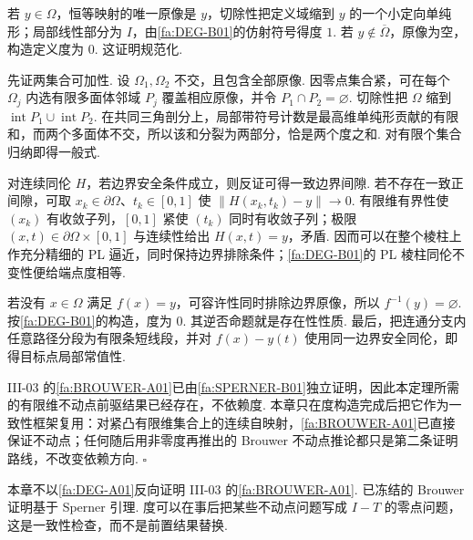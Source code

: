 \begin{FAProof}
若 \(\displaystyle y\in\Omega\)，恒等映射的唯一原像是 \(\displaystyle y\)，切除性把定义域缩到 \(\displaystyle y\) 的一个小定向单纯形；局部线性部分为 \(\displaystyle I\)，由\autoref{fa:DEG-B01}的仿射符号得度 \(\displaystyle1\). 若 \(\displaystyle y\notin\overline\Omega\)，原像为空，构造定义度为 \(\displaystyle0\). 这证明规范化.

先证两集合可加性. 设 \(\displaystyle\Omega_1,\Omega_2\) 不交，且包含全部原像. 因零点集合紧，可在每个 \(\displaystyle\Omega_j\) 内选有限多面体邻域 \(\displaystyle P_j\) 覆盖相应原像，并令 \(\displaystyle P_1\cap P_2=\varnothing\). 切除性把 \(\displaystyle\Omega\) 缩到 \(\displaystyle\operatorname{int}P_1\cup\operatorname{int}P_2\). 在共同三角剖分上，局部带符号计数是最高维单纯形贡献的有限和，而两个多面体不交，所以该和分裂为两部分，恰是两个度之和. 对有限个集合归纳即得一般式.

对连续同伦 \(\displaystyle H\)，若边界安全条件成立，则反证可得一致边界间隙. 若不存在一致正间隙，可取 \(\displaystyle x_k\in\partial\Omega\)、\(\displaystyle t_k\in[0,1]\) 使 \(\displaystyle\|H(x_k,t_k)-y\|\to0\). 有限维有界性使 \(\displaystyle(x_k)\) 有收敛子列，\(\displaystyle[0,1]\) 紧使 \(\displaystyle(t_k)\) 同时有收敛子列；极限 \(\displaystyle(x,t)\in\partial\Omega\times[0,1]\) 与连续性给出 \(\displaystyle H(x,t)=y\)，矛盾. 因而可以在整个棱柱上作充分精细的 PL 逼近，同时保持边界排除条件；\autoref{fa:DEG-B01}的 PL 棱柱同伦不变性便给端点度相等.

若没有 \(\displaystyle x\in\Omega\) 满足 \(\displaystyle f(x)=y\)，可容许性同时排除边界原像，所以 \(\displaystyle f^{-1}(y)=\varnothing\). 按\autoref{fa:DEG-B01}的构造，度为 \(\displaystyle0\). 其逆否命题就是存在性性质. 最后，把连通分支内任意路径分段为有限条短线段，并对 \(\displaystyle f(x)-y(t)\) 使用同一边界安全同伦，即得目标点局部常值性.

III-03 的\autoref{fa:BROUWER-A01}已由\autoref{fa:SPERNER-B01}独立证明，因此本定理所需的有限维不动点前驱结果已经存在，不依赖度. 本章只在度构造完成后把它作为一致性框架复用：对紧凸有限维集合上的连续自映射，\autoref{fa:BROUWER-A01}已直接保证不动点；任何随后用非零度再推出的 Brouwer 不动点推论都只是第二条证明路线，不改变依赖方向. \hfill\(\square\)
\end{FAProof}

\begin{FARemark}
本章不以\autoref{fa:DEG-A01}反向证明 III-03 的\autoref{fa:BROUWER-A01}. 已冻结的 Brouwer 证明基于 Sperner 引理. 度可以在事后把某些不动点问题写成 \(\displaystyle I-T\) 的零点问题，这是一致性检查，而不是前置结果替换.
\end{FARemark}

